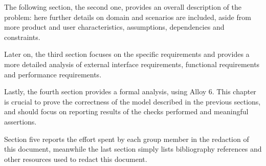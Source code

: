 The following section, the second one, provides an overall description of the problem: here further
details on domain and scenarios are included, aside from more product and user characteristics, assumptions,
dependencies and constraints.

Later on, the third section focuses on the specific requirements and provides a more detailed analysis of external
interface requirements, functional requirements and performance requirements.

Lastly, the fourth section provides a formal analysis, using Alloy 6.
This chapter is crucial to prove the correctness of the model described in the previous sections, and should focus on
reporting results of the checks performed and meaningful assertions.

Section five reports the effort spent by each group member in the redaction of this document, meanwhile the last
section simply lists bibliography references and other resources used to redact this document.
